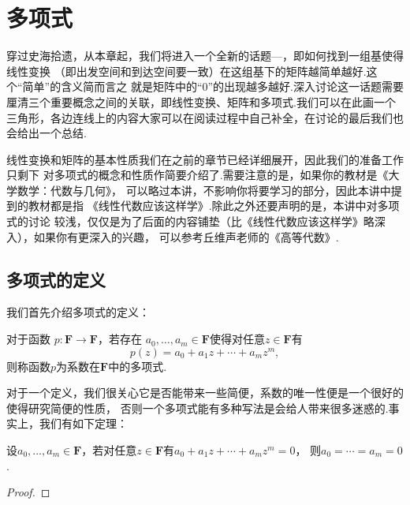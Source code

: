 \chapter{多项式}

穿过史海拾遗，从本章起，我们将进入一个全新的话题—，即如何找到一组基使得线性变换
（即出发空间和到达空间要一致）在这组基下的矩阵越简单越好.这个``简单''的含义简而言之
就是矩阵中的``0''的出现越多越好.深入讨论这一话题需要
厘清三个重要概念之间的关联，即线性变换、矩阵和多项式.我们可以在此画一个
三角形，各边连线上的内容大家可以在阅读过程中自己补全，在讨论的最后我们也会给出一个总结.

\begin{figure}[H]
    \centering
\end{figure}

线性变换和矩阵的基本性质我们在之前的章节已经详细展开，因此我们的准备工作只剩下
对多项式的概念和性质作简要介绍了.需要注意的是，如果你的教材是《大学数学：代数与几何》，
可以略过本讲，不影响你将要学习的部分，因此本讲中提到的教材都是指
《线性代数应该这样学》.除此之外还要声明的是，本讲中对多项式的讨论
较浅，仅仅是为了后面的内容铺垫（比《线性代数应该这样学》略深入），如果你有更深入的兴趣，
可以参考丘维声老师的《高等代数》.

\section{多项式的定义}
我们首先介绍多项式的定义：
\begin{definition}
    对于函数 $p:\mathbf{F}\to\mathbf{F}$，若存在
    $a_0,\ldots,a_m\in\mathbf{F}$使得对任意$z\in\mathbf{F}$有
    \begin{equation}\label{eq:17:多项式定义}
        p(z)=a_0+a_1z+\cdots+a_mz^m,
    \end{equation}
    则称函数$p$为系数在$\mathbf{F}$中的多项式.
\end{definition}

对于一个定义，我们很关心它是否能带来一些简便，系数的唯一性便是一个很好的使得研究简便的性质，
否则一个多项式能有多种写法是会给人带来很多迷惑的.事实上，我们有如下定理：
\begin{theorem}
    设$a_0,\ldots,a_m\in\mathbf{F}$，若对任意$z\in\mathbf{F}$有$a_0+a_1z+\cdots+a_mz^m=0$，
    则$a_0=\cdots=a_m=0$.
\end{theorem}
\begin{proof}
    
\end{proof}

